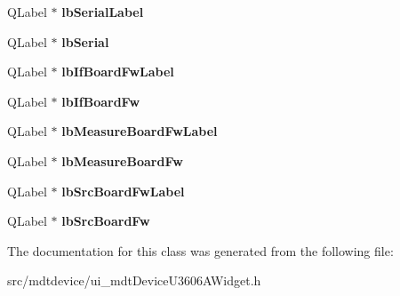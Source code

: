 \begin{DoxyCompactItemize}
\item 
\hypertarget{class_ui__mdt_device_u3606_a_widget_abdff7cf61e6f613b24d1799522c0e357}{
QLabel $\ast$ {\bfseries lbSerialLabel}}
\label{class_ui__mdt_device_u3606_a_widget_abdff7cf61e6f613b24d1799522c0e357}

\item 
\hypertarget{class_ui__mdt_device_u3606_a_widget_a268a390c071e035acaa2f1b4d211bc31}{
QLabel $\ast$ {\bfseries lbSerial}}
\label{class_ui__mdt_device_u3606_a_widget_a268a390c071e035acaa2f1b4d211bc31}

\item 
\hypertarget{class_ui__mdt_device_u3606_a_widget_ad11e8aded543cc1eeaaaf3e6753089d3}{
QLabel $\ast$ {\bfseries lbIfBoardFwLabel}}
\label{class_ui__mdt_device_u3606_a_widget_ad11e8aded543cc1eeaaaf3e6753089d3}

\item 
\hypertarget{class_ui__mdt_device_u3606_a_widget_af7898574daf7278c6eedbcfabc4dd715}{
QLabel $\ast$ {\bfseries lbIfBoardFw}}
\label{class_ui__mdt_device_u3606_a_widget_af7898574daf7278c6eedbcfabc4dd715}

\item 
\hypertarget{class_ui__mdt_device_u3606_a_widget_a495247df2ff7229a0f199926bafbc1d2}{
QLabel $\ast$ {\bfseries lbMeasureBoardFwLabel}}
\label{class_ui__mdt_device_u3606_a_widget_a495247df2ff7229a0f199926bafbc1d2}

\item 
\hypertarget{class_ui__mdt_device_u3606_a_widget_a0e3a19572ce44c827c5f2c8cdd910aac}{
QLabel $\ast$ {\bfseries lbMeasureBoardFw}}
\label{class_ui__mdt_device_u3606_a_widget_a0e3a19572ce44c827c5f2c8cdd910aac}

\item 
\hypertarget{class_ui__mdt_device_u3606_a_widget_a9e876113b12bbbd2b43a0e057ad577d0}{
QLabel $\ast$ {\bfseries lbSrcBoardFwLabel}}
\label{class_ui__mdt_device_u3606_a_widget_a9e876113b12bbbd2b43a0e057ad577d0}

\item 
\hypertarget{class_ui__mdt_device_u3606_a_widget_a7e48af183581a6be283f8fef932e8ec0}{
QLabel $\ast$ {\bfseries lbSrcBoardFw}}
\label{class_ui__mdt_device_u3606_a_widget_a7e48af183581a6be283f8fef932e8ec0}

\end{DoxyCompactItemize}


The documentation for this class was generated from the following file:\begin{DoxyCompactItemize}
\item 
src/mdtdevice/ui\_\-mdtDeviceU3606AWidget.h\end{DoxyCompactItemize}
